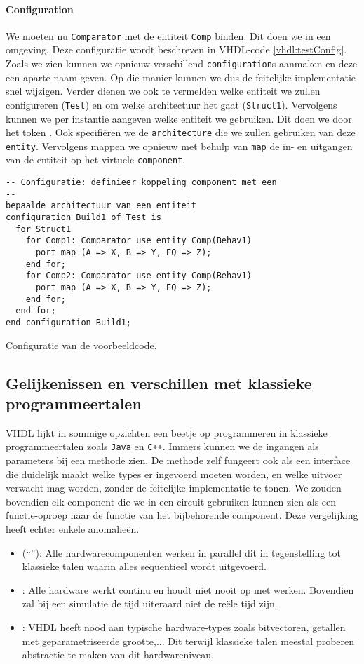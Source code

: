\paragraph{Configuration} We moeten nu \texttt{Comparator} met de entiteit \texttt{Comp} binden. Dit doen we in een  omgeving. Deze configuratie wordt beschreven in VHDL-code \ref{vhdl:testConfig}. Zoals we zien kunnen we opnieuw verschillend \texttt{configuration}s aanmaken en deze een aparte naam geven. Op die manier kunnen we dus de feitelijke implementatie snel wijzigen. Verder dienen we ook te vermelden welke entiteit we zullen configureren (\texttt{Test}) en om welke architectuur het gaat (\texttt{Struct1}). Vervolgens kunnen we per instantie aangeven welke entiteit we gebruiken. Dit doen we door het token . Ook specifi\"eren we de \texttt{architecture} die we zullen gebruiken van deze \texttt{entity}. Vervolgens mappen we opnieuw met behulp van \texttt{map} de in- en uitgangen van de entiteit op het virtuele \texttt{component}.
\begin{vhdlcode}
\begin{lstlisting}
-- Configuratie: definieer koppeling component met een
--
bepaalde architectuur van een entiteit
configuration Build1 of Test is
  for Struct1
    for Comp1: Comparator use entity Comp(Behav1)
      port map (A => X, B => Y, EQ => Z);
    end for;
    for Comp2: Comparator use entity Comp(Behav1)
      port map (A => X, B => Y, EQ => Z);
    end for;
  end for;
end configuration Build1;
\end{lstlisting}
\caption{Configuratie van de voorbeeldcode.}
\label{vhdl:testConfig}
\end{vhdlcode}
\subsection{Gelijkenissen en verschillen met klassieke programmeertalen}
VHDL lijkt in sommige opzichten een beetje op programmeren in klassieke programmeertalen zoals \texttt{Java} en \texttt{C++}. Immers kunnen we de ingangen als parameters bij een methode zien. De methode zelf fungeert ook als een interface die duidelijk maakt welke types er ingevoerd moeten worden, en welke uitvoer verwacht mag worden, zonder de feitelijke implementatie te tonen. We zouden bovendien elk component die we in een circuit gebruiken kunnen zien als een functie-oproep naar de functie van het bijbehorende component. Deze vergelijking heeft echter enkele anomalie\"en.
\begin{itemize}
 \item {} (``''): Alle hardwarecomponenten werken in parallel dit in tegenstelling tot klassieke talen waarin alles sequentieel wordt uitgevoerd.
 \item {}: Alle hardware werkt continu en houdt niet nooit op met werken. Bovendien zal bij een simulatie de tijd uiteraard niet de re\"ele tijd zijn.
 \item {}: VHDL heeft nood aan typische hardware-types zoals bitvectoren, getallen met geparametriseerde grootte,... Dit terwijl klassieke talen meestal proberen abstractie te maken van dit hardwareniveau.
\end{itemize}
